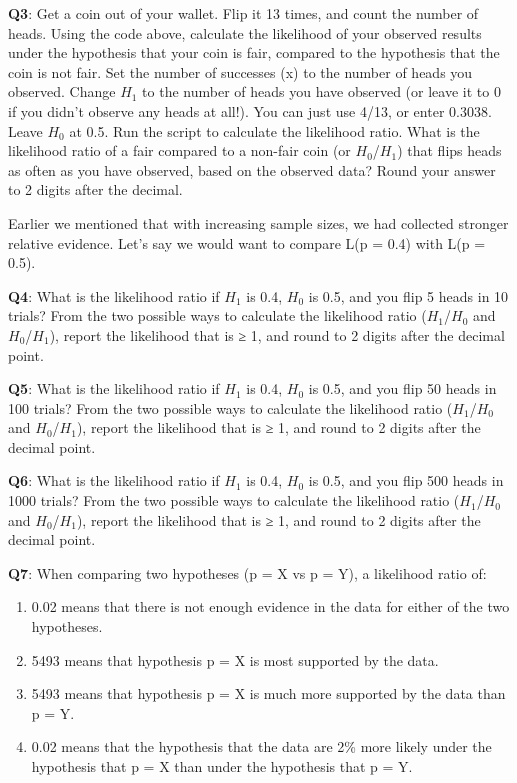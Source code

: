 \documentclass[
  oneside]{krantz}
\providecommand{\tightlist}{%
  \setlength{\itemsep}{0pt}\setlength{\parskip}{0pt}}
\begin{document}
\textbf{Q3}: Get a coin out of your wallet. Flip it 13 times, and count the number of heads. Using the code above, calculate the likelihood of your observed results under the hypothesis that your coin is fair, compared to the hypothesis that the coin is not fair. Set the number of successes (x) to the number of heads you observed. Change \(H_1\) to the number of heads you have observed (or leave it to 0 if you didn't observe any heads at all!). You can just use 4/13, or enter 0.3038. Leave \(H_0\) at 0.5. Run the script to calculate the likelihood ratio. What is the likelihood ratio of a fair compared to a non-fair coin (or \(H_0\)/\(H_1\)) that flips heads as often as you have observed, based on the observed data? Round your answer to 2 digits after the decimal.

Earlier we mentioned that with increasing sample sizes, we had collected stronger relative evidence. Let's say we would want to compare L(p = 0.4) with L(p = 0.5).

\textbf{Q4}: What is the likelihood ratio if \(H_1\) is 0.4, \(H_0\) is 0.5, and you flip 5 heads in 10 trials? From the two possible ways to calculate the likelihood ratio (\(H_1\)/\(H_0\) and \(H_0\)/\(H_1\)), report the likelihood that is ≥ 1, and round to 2 digits after the decimal point.

\textbf{Q5}: What is the likelihood ratio if \(H_1\) is 0.4, \(H_0\) is 0.5, and you flip 50 heads in 100 trials? From the two possible ways to calculate the likelihood ratio (\(H_1\)/\(H_0\) and \(H_0\)/\(H_1\)), report the likelihood that is ≥ 1, and round to 2 digits after the decimal point.

\textbf{Q6}: What is the likelihood ratio if \(H_1\) is 0.4, \(H_0\) is 0.5, and you flip 500 heads in 1000 trials? From the two possible ways to calculate the likelihood ratio (\(H_1\)/\(H_0\) and \(H_0\)/\(H_1\)), report the likelihood that is ≥ 1, and round to 2 digits after the decimal point.

\textbf{Q7}: When comparing two hypotheses (p = X vs p = Y), a likelihood ratio of:

\begin{enumerate}
\def\labelenumi{\Alph{enumi})}
\tightlist
\item
  0.02 means that there is not enough evidence in the data for either of the two hypotheses.
\item
  5493 means that hypothesis p = X is most supported by the data.
\item
  5493 means that hypothesis p = X is much more supported by the data than p = Y.
\item
  0.02 means that the hypothesis that the data are 2\% more likely under the hypothesis that p = X than under the hypothesis that p = Y.
\end{enumerate}
\end{document}
